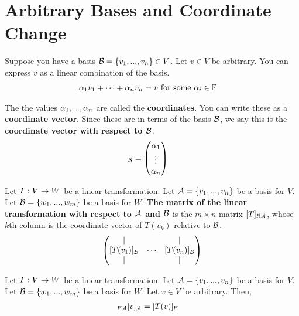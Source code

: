 \section{Arbitrary Bases and Coordinate Change}
\begin{definition}
    Suppose you have a basis $\mathcal{B} = \{v_1, ..., v_n\} \in V$. Let $v \in V$ be arbitrary. You can express $v$ as a linear combination of the basis.
    \begin{align*}
        \alpha_1 v_1 + \cdots + \alpha_n v_n &= v \text{ for some $\alpha_i \in \mathbb{F}$}
    \end{align*}

    The the values $\alpha_1, ..., \alpha_n$ are called the \textbf{coordinates}. You can write these as a \textbf{coordinate vector}. Since these are in terms
    of the basis $\mathcal{B}$, we say this is the \textbf{coordinate vector with respect to $\mathcal{B}$}.
    \begin{align*}
        [v]_{\cB} &= \vect{\ga_1 \\ \vdots \\ \ga_n}
    \end{align*}
\end{definition}

\begin{definition}
    Let $T : V \rightarrow W$ be a linear transformation. Let $\mathcal{A} = \{v_1, ..., v_n\}$ be a basis for $V$. Let $\mathcal{B} = \{w_1, ..., w_m\}$ be a basis for $W$.
    \textbf{The matrix of the linear transformation with respect to $\mathcal{A}$ and $\mathcal{B}$} is the $m \times n$ matrix $[T]_{\mathcal{B} \mathcal{A}}$, whose $k$th column is
    the coordinate vector of $T(v_k)$ relative to $\mathcal{B}$.
    \begin{align*}
        \begin{pmatrix}
            | & & | \\
            [T(v_1)]_{\mathcal{B}} & \cdots & [T(v_n)]_{\mathcal{B}} \\
            | & & |
        \end{pmatrix}
    \end{align*}
\end{definition}

\begin{lemma}
    Let $T : V \rightarrow W$ be a linear transformation. Let $\mathcal{A} = \{v_1, ..., v_n\}$ be a basis for $V$. Let $\mathcal{B} = \{w_1, ..., w_m\}$ be a basis for $W$.
    Let $v \in V$ be arbitrary. Then,
    \begin{align*}
        [T]_{\cB\cA} [v]_\cA &= [T(v)]_\cB
    \end{align*}
\end{lemma}

